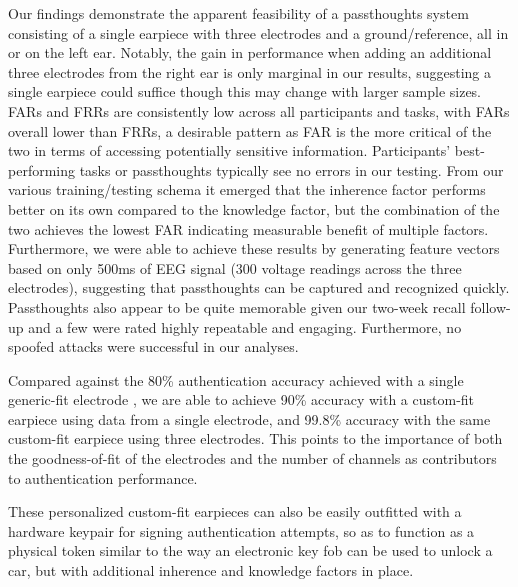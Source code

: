 \documentclass[a4paper,twoside]{article}
\begin{document}
\noindent Our findings demonstrate the apparent feasibility of a passthoughts system consisting of a single earpiece with three electrodes and a ground/reference, all in or on the left ear. Notably, the gain in performance when adding an additional three electrodes from the right ear is only marginal in our results, suggesting a single earpiece could suffice though this may change with larger sample sizes. FARs and FRRs are consistently low across all participants and tasks, with FARs overall lower than FRRs, a desirable pattern as FAR is the more critical of the two in terms of accessing potentially sensitive information. Participants' best-performing tasks or passthoughts typically see no errors in our testing. From our various training/testing schema it emerged that the inherence factor performs better on its own compared to the knowledge factor, but the combination of the two achieves the lowest FAR indicating measurable benefit of multiple factors. Furthermore, we were able to achieve these results by generating feature vectors based on only 500ms of EEG signal (300 voltage readings across the three electrodes), suggesting that passthoughts can be captured and recognized quickly. Passthoughts also appear to be quite memorable given our two-week recall follow-up and a few were rated highly repeatable and engaging. Furthermore, no spoofed attacks were successful in our analyses. 

Compared against the 80\% authentication accuracy achieved with a single generic-fit electrode \cite{curran2016passthoughts}, we are able to achieve 90\% accuracy with a custom-fit earpiece using data from a single electrode, and 99.8\% accuracy with the same custom-fit earpiece using three electrodes. This points to the importance of both the goodness-of-fit of the electrodes and the number of channels as contributors to authentication performance.

These personalized custom-fit earpieces can also be easily outfitted with a hardware keypair for signing authentication attempts, so as to function as a physical token similar to the way an electronic key fob can be used to unlock a car, but with additional inherence and knowledge factors in place.
\end{document}

